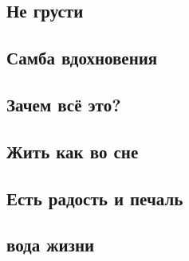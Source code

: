 \documentclass[
]{article}
\begin{document}
\hypertarget{ux43dux435-ux433ux440ux443ux441ux442ux438}{%
\subsection*{Не грусти}\label{ux43dux435-ux433ux440ux443ux441ux442ux438}}

\hypertarget{ux441ux430ux43cux431ux430-ux432ux434ux43eux445ux43dux43eux432ux435ux43dux438ux44f}{%
\subsection*{Самба вдохновения}\label{ux441ux430ux43cux431ux430-ux432ux434ux43eux445ux43dux43eux432ux435ux43dux438ux44f}}

\hypertarget{ux437ux430ux447ux435ux43c-ux432ux441ux451-ux44dux442ux43e}{%
\subsection*{Зачем всё это?}\label{ux437ux430ux447ux435ux43c-ux432ux441ux451-ux44dux442ux43e}}

\hypertarget{ux436ux438ux442ux44c-ux43aux430ux43a-ux432ux43e-ux441ux43dux435}{%
\subsection*{Жить как во сне}\label{ux436ux438ux442ux44c-ux43aux430ux43a-ux432ux43e-ux441ux43dux435}}

\hypertarget{ux435ux441ux442ux44c-ux440ux430ux434ux43eux441ux442ux44c-ux438-ux43fux435ux447ux430ux43bux44c}{%
\subsection*{Есть радость и печаль}\label{ux435ux441ux442ux44c-ux440ux430ux434ux43eux441ux442ux44c-ux438-ux43fux435ux447ux430ux43bux44c}}

\hypertarget{ux432ux43eux434ux430-ux436ux438ux437ux43dux438}{%
\subsection*{вода жизни}\label{ux432ux43eux434ux430-ux436ux438ux437ux43dux438}}
\end{document}
